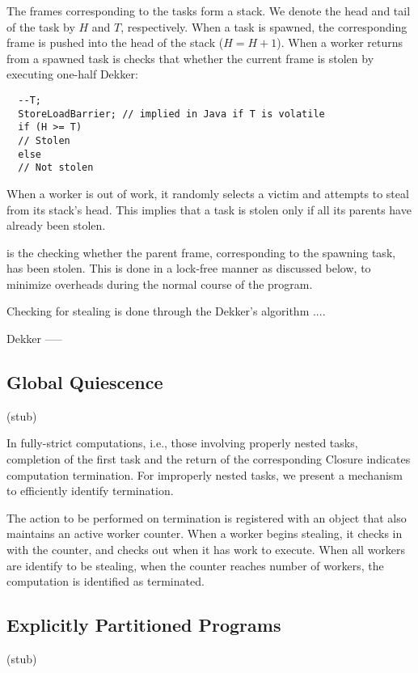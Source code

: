 The frames corresponding to the tasks form a stack. We denote the head
and tail of the task by $H$ and $T$, respectively. When a task is
spawned, the corresponding frame is pushed into the head of the stack
($H=H+1$). When a worker returns from a spawned task is checks that
whether the current frame is stolen by executing one-half Dekker:

\begin{verbatim}
  --T; 
  StoreLoadBarrier; // implied in Java if T is volatile
  if (H >= T) 
  // Stolen 
  else 
  // Not stolen
\end{verbatim}

When a worker is out of work, it randomly selects a victim and
attempts to steal from its stack's head. This implies that a task is
stolen only if all its parents have already been stolen. 

is the checking whether the parent frame, corresponding to the
spawning task, has been stolen. This is done in a lock-free manner as
discussed below, to minimize overheads during the normal course of the
program.




Checking for stealing is done through the Dekker's algorithm ....

Dekker -----


\subsection{Global Quiescence}

(stub)

In fully-strict computations, i.e., those involving properly nested
tasks, completion of the first task and the return of the
corresponding Closure indicates computation termination. For
improperly nested tasks, we present a mechanism to efficiently
identify termination. 

The action to be performed on termination is registered with an object
that also maintains an active worker counter. When a worker begins
stealing, it checks in with the counter, and checks out when it has
work to execute. When all workers are identify to be stealing, when
the counter reaches number of workers, the computation is identified
as terminated. 


\subsection{Explicitly Partitioned Programs}

(stub)

